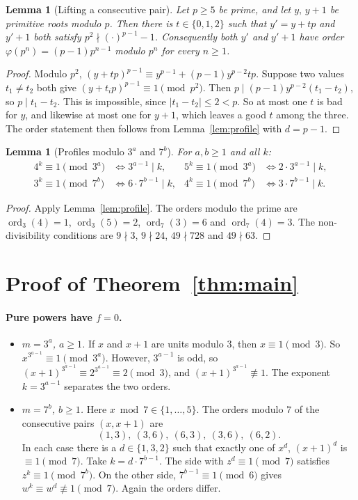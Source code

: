 \documentclass[11pt]{article}
\newtheorem{lemma}[theorem]{Lemma}
\theoremstyle{remark}
\newcommand{\ord}{\operatorname{ord}}
\begin{document}
\begin{lemma}[Lifting a consecutive pair]\label{lem:lift}
Let $p\ge5$ be prime, and let $y,\,y+1$ be primitive roots modulo $p$. Then there is
$t\in\{0,1,2\}$ such that $y'=y+tp$ and $y'+1$ both satisfy $p^2\nmid (\cdot)^{p-1}-1$.
Consequently both $y'$ and $y'+1$ have order $\varphi(p^n)=(p-1)p^{n-1}$ modulo $p^n$ for every
$n\ge1$.
\end{lemma}
\begin{proof}
Modulo $p^2$, $(y+tp)^{p-1}\equiv y^{p-1}+(p-1)y^{p-2}tp$. Suppose two values $t_1\ne t_2$
both give $(y+t_ip)^{p-1}\equiv1\pmod{p^2}$. Then $p\mid (p-1)y^{p-2}(t_1-t_2)$, so
$p\mid t_1-t_2$. This is impossible, since $|t_1-t_2|\le2<p$. So at most one $t$ is bad for
$y$, and likewise at most one for $y+1$, which leaves a good $t$ among the three. The order
statement then follows from Lemma~\ref{lem:profile} with $d=p-1$.
\end{proof}

\begin{lemma}[Profiles modulo $3^a$ and $7^b$]\label{lem:37}
For $a,b\ge1$ and all $k$:
\begin{align*}
4^k\equiv1 \!\!\pmod{3^a} &\iff 3^{a-1}\mid k, &
5^k\equiv1 \!\!\pmod{3^a} &\iff 2\cdot3^{a-1}\mid k,\\
3^k\equiv1 \!\!\pmod{7^b} &\iff 6\cdot7^{b-1}\mid k, &
4^k\equiv1 \!\!\pmod{7^b} &\iff 3\cdot7^{b-1}\mid k.
\end{align*}
\end{lemma}
\begin{proof}
Apply Lemma~\ref{lem:profile}. The orders modulo the prime are
$\ord_3(4)=1$, $\ord_3(5)=2$, $\ord_7(3)=6$ and $\ord_7(4)=3$. The non-divisibility conditions
are $9\nmid 3$, $9\nmid 24$, $49\nmid 728$ and $49\nmid 63$.
\end{proof}

\section{Proof of Theorem~\ref{thm:main}}

\paragraph{Pure powers have $f=0$.}
\begin{itemize}
  \item \emph{$m=3^a$, $a\ge1$.} If $x$ and $x+1$ are units modulo $3$, then $x\equiv1\pmod 3$.
    So $x^{3^{a-1}}\equiv1\pmod{3^a}$. However, $3^{a-1}$ is odd, so
    $(x+1)^{3^{a-1}}\equiv2^{3^{a-1}}\equiv2\pmod 3$, and $(x+1)^{3^{a-1}}\not\equiv1$.
    The exponent $k=3^{a-1}$ separates the two orders.
  \item \emph{$m=7^b$, $b\ge1$.} Here $x\bmod 7\in\{1,\dots,5\}$. The orders modulo $7$ of the
    consecutive pairs $(x,x+1)$ are
    \[ (1,3),\ (3,6),\ (6,3),\ (3,6),\ (6,2). \]
    In each case there is a $d\in\{1,3,2\}$ such that exactly one of $x^d$, $(x+1)^d$ is
    $\equiv1\pmod7$. Take $k=d\cdot7^{b-1}$. The side with $z^d\equiv1\pmod 7$ satisfies
    $z^k\equiv1\pmod{7^b}$. On the other side, $7^{b-1}\equiv1\pmod 6$ gives
    $w^k\equiv w^d\not\equiv1\pmod 7$. Again the orders differ.
\end{itemize}
\end{document}

